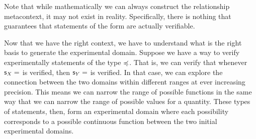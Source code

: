 \begin{mathSection}
\begin{justification}
		Note that while mathematically we can always construct the relationship metacontext, it may not exist in reality. Specifically, there is nothing that guarantees that statements of the form  are actually verifiable.
	\end{justification}
\end{mathSection}

Now that we have the right context, we have to understand what is the right basis to generate the experimental domain. Suppose we have a way to verify experimentally statements of the type $\preccurlyeq$. That is, we can verify that whenever $\mathsf{s}_X=$ is verified, then $\mathsf{s}_Y=$ is verified. In that case, we can explore the connection between the two domains within different ranges at ever increasing precision. This means we can narrow the range of possible functions in the same way that we can narrow the range of possible values for a quantity. These types of statements, then, form an experimental domain where each possibility corresponds to a possible continuous function between the two initial experimental domains.

